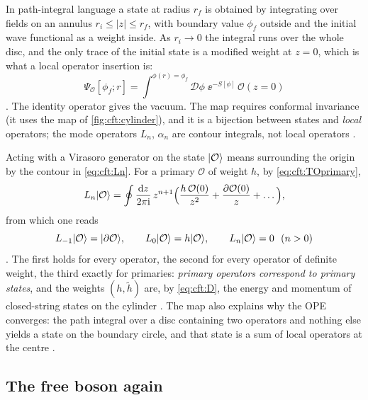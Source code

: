 In path-integral language a state at radius $r_f$ is obtained by integrating over fields on an
annulus $r_i\le|z|\le r_f$, with boundary value $\phi_f$ outside and the initial wave functional
as a weight inside. As $r_i\to0$ the integral runs over the whole disc, and the only trace of the
initial state is a modified weight at $z=0$, which is what a local operator insertion is:
\begin{equation}\label{eq:cft:stateop}
  \Psi_{\mathcal O}[\phi_f;r]=\int^{\phi(r)=\phi_f}\mathcal D\phi\;\ee^{-S[\phi]}\,
  \mathcal O(z=0)
\end{equation}
. The identity operator gives the vacuum. The map requires
conformal invariance (it uses the map of \cref{fig:cft:cylinder}), and it is a bijection between
states and \emph{local} operators; the mode operators $L_n$, $\alpha_n$ are contour integrals, not
local operators .

Acting with a Virasoro generator on the state $|\mathcal O\rangle$ means surrounding the origin by
the contour in \eqref{eq:cft:Ln}. For a primary $\mathcal O$ of weight $h$, by
\eqref{eq:cft:TOprimary},
\begin{equation}\label{eq:cft:LnO}
  L_n|\mathcal O\rangle=\oint\frac{\mathrm{d} z}{2\pi\mathrm{i}}\,z^{n+1}\Big(\frac{h\,\mathcal O(0)}{z^2}
   +\frac{\partial\mathcal O(0)}{z}+\dots\Big),
\end{equation}
from which one reads
\begin{equation}\label{eq:cft:LnOresults}
  L_{-1}|\mathcal O\rangle=|\partial\mathcal O\rangle,\qquad
  L_0|\mathcal O\rangle=h|\mathcal O\rangle,\qquad
  L_n|\mathcal O\rangle=0\ \ (n>0)
\end{equation}
. The first holds for every operator, the second for every
operator of definite weight, the third exactly for primaries: \emph{primary operators correspond
to primary states}, and the weights $(h,\tilde h)$ are, by \eqref{eq:cft:D}, the energy and
momentum of closed-string states on the cylinder . The map
also explains why the OPE converges: the path integral over a disc containing two operators and
nothing else yields a state on the boundary circle, and that state is a sum of local operators at
the centre .

\subsection{The free boson again}

